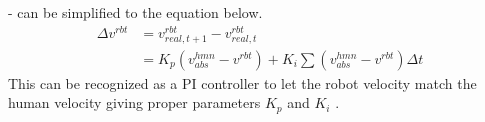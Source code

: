 - can be simplified to the equation below.
\begin{align}
\Delta v^{rbt} &= v^{rbt}_{real, t+1} - v^{rbt}_{real, t}\\
&= K_p(v^{hmn}_{abs} - v^{rbt}) + K_i\sum (v^{hmn}_{abs} - v^{rbt}) \Delta t
\end{align}
This can be recognized as a PI controller to let the robot velocity match the human velocity giving proper parameters \(K_p\) and \(K_i\)%
.



